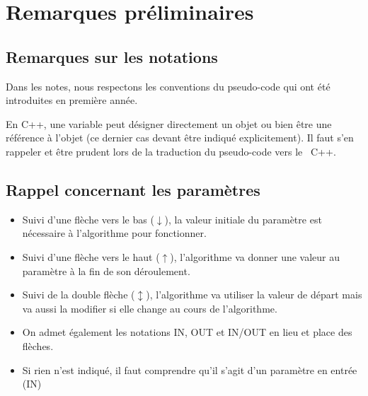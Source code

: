 \chapter{Remarques préliminaires}

\section{Remarques sur les notations}

	\begin{liste}
		\item 
			Dans les notes, nous respectons les conventions du pseudo-code 
			qui ont été introduites en première année.
		\item
			En C++, une variable peut désigner directement un objet 
			ou bien être une référence à l'objet (ce dernier cas devant être
			indiqué explicitement). Il faut s'en rappeler et être prudent 
			lors de la traduction du pseudo-code vers le \ C++.
	\end{liste}

\section{Rappel concernant les paramètres}

	\begin{itemize}
		\item 
			Suivi d'une flèche vers le bas ($\downarrow $), la valeur initiale du 
			paramètre est nécessaire à l'algorithme pour fonctionner.
		\item 
			Suivi d'une flèche vers le haut ($\uparrow $), l'algorithme va donner 
			une valeur au paramètre à la fin de son déroulement.
		\item
			Suivi de la double flèche ($\updownarrow $), l'algorithme va utiliser 
			la valeur de départ mais va aussi la modifier si 
			elle change au cours de l'algorithme.
		\item
			On admet également les notations IN, OUT et IN/OUT en lieu et place des flèches.
		\item
			Si rien n'est indiqué, il faut comprendre qu'il s'agit d'un paramètre en entrée (IN)
	\end{itemize}